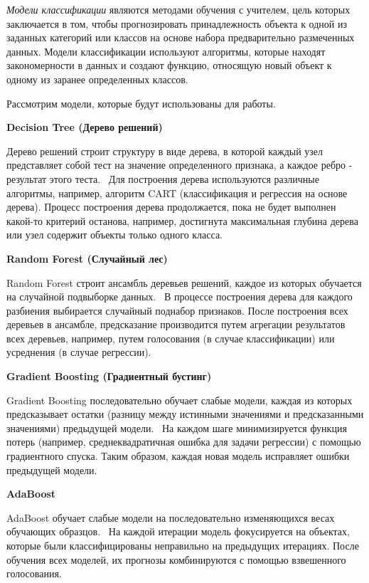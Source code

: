 \textit{Модели классификации} являются методами обучения с учителем, цель которых заключается в том, чтобы прогнозировать принадлежность объекта к одной из заданных категорий или классов на основе набора предварительно размеченных данных. Модели классификации используют алгоритмы, которые находят закономерности в данных и создают функцию, относящую новый объект к одному из заранее определенных классов.

Рассмотрим модели, которые будут использованы для работы.

\textbf{Decision Tree (Дерево решений)}
    
Дерево решений строит структуру в виде дерева, в которой каждый узел представляет собой тест на значение определенного признака, а каждое ребро - результат этого теста.~\cite{izza2020explaining} Для построения дерева используются различные алгоритмы, например, алгоритм CART (классификация и регрессия на основе дерева). Процесс построения дерева продолжается, пока не будет выполнен какой-то критерий останова, например, достигнута максимальная глубина дерева или узел содержит объекты только одного класса.

\textbf{Random Forest (Случайный лес)}

Random Forest строит ансамбль деревьев решений, каждое из которых обучается на случайной подвыборке данных.~\cite{breiman2001random} В процессе построения дерева для каждого разбиения выбирается случайный поднабор признаков. После построения всех деревьев в ансамбле, предсказание производится путем агрегации результатов всех деревьев, например, путем голосования (в случае классификации) или усреднения (в случае регрессии).

\textbf{Gradient Boosting (Градиентный бустинг)} 

Gradient Boosting последовательно обучает слабые модели, каждая из которых предсказывает остатки (разницу между истинными значениями и предсказанными значениями) предыдущей модели.~\cite{hastie2001elements} На каждом шаге минимизируется функция потерь (например, среднеквадратичная ошибка для задачи регрессии) с помощью градиентного спуска. Таким образом, каждая новая модель исправляет ошибки предыдущей модели.

\textbf{AdaBoost}
    
AdaBoost обучает слабые модели на последовательно изменяющихся весах обучающих образцов.~\cite{Hastie2009MulticlassA} На каждой итерации модель фокусируется на объектах, которые были классифицированы неправильно на предыдущих итерациях. После обучения всех моделей, их прогнозы комбинируются с помощью взвешенного голосования.

